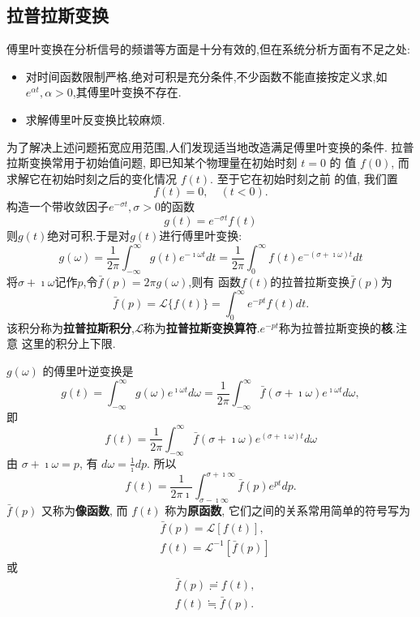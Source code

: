 \subsection{拉普拉斯变换}
\label{subsec:laplace_transform}

傅里叶变换在分析信号的频谱等方面是十分有效的,但在系统分析方面有不足之处:

\begin{itemize}
    \item 对时间函数限制严格,绝对可积是充分条件,不少函数不能直接按定义求,如$e^{\alpha t}, \alpha > 0$,其傅里叶变换不存在.

    \item  求解傅里叶反变换比较麻烦.
\end{itemize}
为了解决上述问题拓宽应用范围,人们发现适当地改造满足傅里叶变换的条件.
拉普拉斯变换常用于初始值问题, 即已知某个物理量在初始时刻 $t=0$ 的 值 $f(0)$, 而求解它在初始时刻之后的变化情况 $f(t)$.
 至于它在初始时刻之前 的值, 我们置
$$
f(t)=0, \quad(t<0) .
$$
构造一个带收敛因子$e^{-\sigma t}, \sigma > 0$的函数
$$
g(t) =e^{-\sigma t} f(t)
$$
则$g(t)$绝对可积.于是对$g(t)$进行傅里叶变换:
\begin{equation}
    g(\omega) = \frac{1}{2\pi}  \int_{-\infty}^{\infty} g(t) e^{-\imath \omega t} dt 
    = \frac{1}{2\pi}  \int_{0}^{\infty} f(t) e^{-(\sigma + \imath \omega) t} dt  
\end{equation}
将$\sigma + \imath \omega$记作$p$,令$\bar{f}(p)=2\pi g(\omega)$,则有
函数$f(t)$的拉普拉斯变换$\bar{f}(p)$为
\begin{equation}
    \bar{f}(p) = \mathcal{L} \{ f(t) \} = \int_0 ^{\infty} e^{-pt} f(t) dt .
\end{equation}
该积分称为\textbf{拉普拉斯积分},$\mathcal{L}$称为\textbf{拉普拉斯变换算符}.$e^{-pt}$称为拉普拉斯变换的\textbf{核}.注意
这里的积分上下限.

$g(\omega)$ 的傅里叶逆变换是
$$
g(t)=\int_{-\infty}^{\infty} g(\omega) e^{\imath \omega t} d \omega=\frac{1}{2 \pi} \int_{-\infty}^{\infty} \bar{f}(\sigma+\imath \omega) e^{\imath \omega t} d \omega,
$$
即
$$
f(t)=\frac{1}{2 \pi} \int_{-\infty}^{\infty} \bar{f}(\sigma+\imath \omega) e^{(\sigma+\imath \omega)t} d \omega
$$
由 $\sigma+\imath \omega=p$, 有 $d \omega=\frac{1}{\imath} d p$. 所以
\begin{equation}
    \label{eq:fourier_mellin_integral}
    f(t)=\frac{1}{2 \pi \imath} \int_{\sigma-\imath \infty}^{\sigma+\imath \infty} \bar{f}(p) e^{ p t} d p .
\end{equation}
$\bar{f}(p)$ 又称为\textbf{像函数}, 而 $f(t)$ 称为\textbf{原函数}, 它们之间的关系常用简单的符号写为
\begin{equation}
\begin{aligned}
& \bar{f}(p)=\mathcal{L}[f(t)], \\
& f(t)=\mathcal{L}^{-1}[\bar{f}(p)]
\end{aligned}
\end{equation}
或
\begin{equation}
\begin{aligned}
& \bar{f}(p) \risingdotseq f(t), \\
& f(t) \fallingdotseq \bar{f}(p) .
\end{aligned}
\end{equation}


